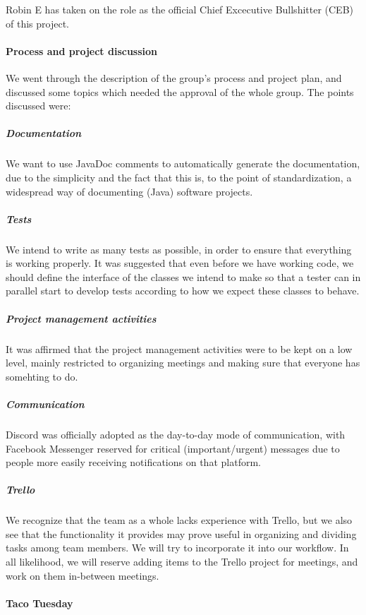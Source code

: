 \documentclass{article}
\begin{document}
Robin E has taken on the role as the official Chief Excecutive Bullshitter (CEB) of this project.

\paragraph{Process and project discussion}

We went through the description of the group's process and project plan, and discussed some topics which needed the approval of the whole group. The points discussed were:

\subparagraph{Documentation}

We want to use JavaDoc comments to automatically generate the documentation, due to the simplicity and the fact that this is, to the point of standardization, a widespread way of documenting (Java) software projects.

\subparagraph{Tests}

We intend to write as many tests as possible, in order to ensure that everything is working properly. It was suggested that even before we have working code, we should define the interface of the classes we intend to make so that a tester can in parallel start to develop tests according to how we expect these classes to behave.

\subparagraph{Project management activities}

It was affirmed that the project management activities were to be kept on a low level, mainly restricted to organizing meetings and making sure that everyone has somehting to do.

\subparagraph{Communication}

Discord was officially adopted as the day-to-day mode of communication, with Facebook Messenger reserved for critical (important/urgent) messages due to people more easily receiving notifications on that platform.

\subparagraph{Trello}

We recognize that the team as a whole lacks experience with Trello, but we also see that the functionality it provides may prove useful in organizing and dividing tasks among team members. We will try to incorporate it into our workflow. In all likelihood, we will reserve adding items to the Trello project for meetings, and work on them in-between meetings.

\paragraph{Taco Tuesday}
\end{document}
